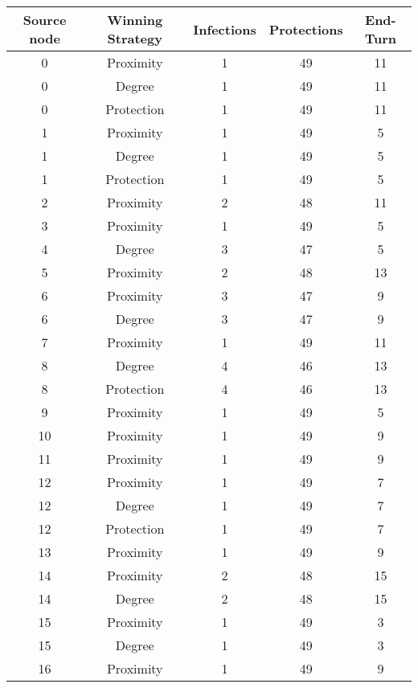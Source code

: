 \documentclass[results.tex]{subfiles}
\begin{document}
\begin{center}
  \begin{tabular}{| c || c | c | c | c |}
    \hline
    {\bfseries Source node} & {\bfseries Winning Strategy} & {\bfseries Infections} & {\bfseries Protections} & {\bfseries End-Turn} \\  %
    \hline\hline
    0 & Proximity & 1 & 49 & 11 \\ 
    \hline
    0 & Degree & 1 & 49 & 11 \\ 
    \hline
    0 & Protection & 1 & 49 & 11 \\ 
    \hline
    1 & Proximity & 1 & 49 & 5 \\ 
    \hline
    1 & Degree & 1 & 49 & 5 \\ 
    \hline
    1 & Protection & 1 & 49 & 5 \\ 
    \hline
    2 & Proximity & 2 & 48 & 11 \\ 
    \hline
    3 & Proximity & 1 & 49 & 5 \\ 
    \hline
    4 & Degree & 3 & 47 & 5 \\ 
    \hline
    5 & Proximity & 2 & 48 & 13 \\ 
    \hline
    6 & Proximity & 3 & 47 & 9 \\ 
    \hline
    6 & Degree & 3 & 47 & 9 \\ 
    \hline
    7 & Proximity & 1 & 49 & 11 \\ 
    \hline
    8 & Degree & 4 & 46 & 13 \\ 
    \hline
    8 & Protection & 4 & 46 & 13 \\ 
    \hline
    9 & Proximity & 1 & 49 & 5 \\ 
    \hline
    10 & Proximity & 1 & 49 & 9 \\ 
    \hline
    11 & Proximity & 1 & 49 & 9 \\ 
    \hline
    12 & Proximity & 1 & 49 & 7 \\ 
    \hline
    12 & Degree & 1 & 49 & 7 \\ 
    \hline
    12 & Protection & 1 & 49 & 7 \\ 
    \hline
    13 & Proximity & 1 & 49 & 9 \\ 
    \hline
    14 & Proximity & 2 & 48 & 15 \\ 
    \hline
    14 & Degree & 2 & 48 & 15 \\ 
    \hline
    15 & Proximity & 1 & 49 & 3 \\ 
    \hline
    15 & Degree & 1 & 49 & 3 \\ 
    \hline
    16 & Proximity & 1 & 49 & 9 \\ 

\end{tabular}
\end{center}
\end{document}
